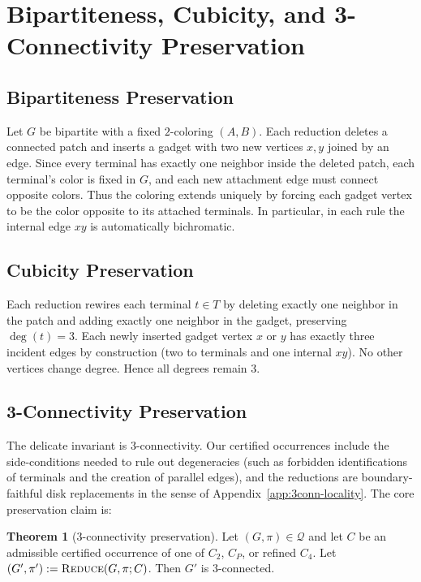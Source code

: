\documentclass[12pt]{article}
\theoremstyle{definition}
\newtheorem{theorem}{Theorem}
\begin{document}
\section{Bipartiteness, Cubicity, and 3-Connectivity Preservation}
\label{sec:other-preservation}

\subsection{Bipartiteness Preservation}
\label{subsec:bipartiteness}

Let $G$ be bipartite with a fixed $2$-coloring $(A,B)$.
Each reduction deletes a connected patch and inserts a gadget with two new vertices $x,y$ joined by an edge.
Since every terminal has exactly one neighbor inside the deleted patch, each terminal's color is fixed in $G$, and each new attachment edge must connect opposite colors.
Thus the coloring extends uniquely by forcing each gadget vertex to be the color opposite to its attached terminals.
In particular, in each rule the internal edge $xy$ is automatically bichromatic.

\subsection{Cubicity Preservation}
\label{subsec:cubicity}

Each reduction rewires each terminal $t\in T$ by deleting exactly one neighbor in the patch and adding exactly one neighbor in the gadget, preserving $\deg(t)=3$.
Each newly inserted gadget vertex $x$ or $y$ has exactly three incident edges by construction (two to terminals and one internal $xy$).
No other vertices change degree. Hence all degrees remain $3$.

\subsection{3-Connectivity Preservation}
\label{subsec:3conn-preservation}

The delicate invariant is $3$-connectivity.
Our certified occurrences include the side-conditions needed to rule out degeneracies (such as forbidden identifications of terminals and the creation of parallel edges), and the reductions are boundary-faithful disk replacements in the sense of Appendix~\ref{app:3conn-locality}.
The core preservation claim is:

\begin{theorem}[3-connectivity preservation]\label{thm:3conn-preservation}
Let $(G,\pi)\in\mathcal{Q}$ and let $C$ be an admissible certified occurrence of one of $C_2$, $C_P$, or refined $C_4$.
Let $(G',\pi'):=\textsc{Reduce}(G,\pi;C)$.
Then $G'$ is $3$-connected.
\end{theorem}
\end{document}
